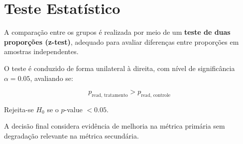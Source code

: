 \section{Teste Estatístico}

A comparação entre os grupos é realizada por meio de um \textbf{teste de duas proporções (z-test)}, adequado para avaliar diferenças entre proporções em amostras independentes.

O teste é conduzido de forma unilateral à direita, com nível de significância $\alpha = 0.05$, avaliando se:

\[
p_{\text{read, tratamento}} > p_{\text{read, controle}}
\]

Rejeita-se $H_0$ se o $p$-value $< 0.05$.

A decisão final considera evidência de melhoria na métrica primária sem degradação relevante na métrica secundária.


